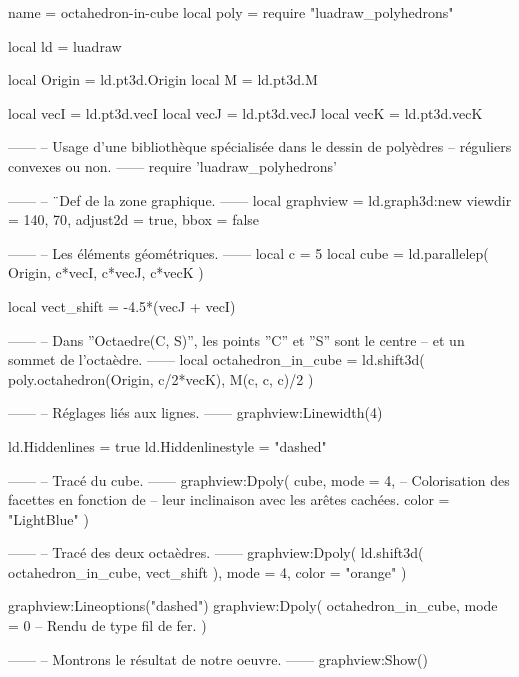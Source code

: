 \documentclass[border = 3pt]{standalone}
\begin{document}
\begin{luadraw*}{name = octahedron-in-cube}
local poly = require "luadraw_polyhedrons"

local ld = luadraw

local Origin = ld.pt3d.Origin
local M      = ld.pt3d.M

local vecI = ld.pt3d.vecI
local vecJ = ld.pt3d.vecJ
local vecK = ld.pt3d.vecK

------
-- Usage d'une bibliothèque spécialisée dans le dessin de polyèdres
-- réguliers convexes ou non.
------
require 'luadraw_polyhedrons'

------
-- ¨Def de la zone graphique.
------
local graphview = ld.graph3d:new{
  viewdir  = {140, 70},
  adjust2d = true,
  bbox     = false
}

------
-- Les éléments géométriques.
------
local c = 5
local cube = ld.parallelep(
  Origin,
  c*vecI, c*vecJ, c*vecK
)

local vect_shift = -4.5*(vecJ + vecI)

------
-- Dans ''Octaedre(C, S)'', les points ''C'' et ''S'' sont le centre
-- et un sommet de l'octaèdre.
------
local octahedron_in_cube = ld.shift3d(
  poly.octahedron(Origin, c/2*vecK),
  M(c, c, c)/2
)

------
-- Réglages liés aux lignes.
------
graphview:Linewidth(4)

ld.Hiddenlines     = true
ld.Hiddenlinestyle = "dashed"

------
-- Tracé du cube.
------
graphview:Dpoly(
  cube,
  {
    mode  = 4,  -- Colorisation des facettes en fonction de
                -- leur inclinaison avec les arêtes cachées.
    color = "LightBlue"
  }
)

------
-- Tracé des deux octaèdres.
------
graphview:Dpoly(
  ld.shift3d(
    octahedron_in_cube,
    vect_shift
  ),
  {
    mode = 4,
    color = "orange"
  }
)

graphview:Lineoptions("dashed")
graphview:Dpoly(
  octahedron_in_cube,
  {
    mode = 0  -- Rendu de type fil de fer.
  }
)

------
-- Montrons le résultat de notre oeuvre.
------
graphview:Show()
\end{luadraw*}
\end{document}
